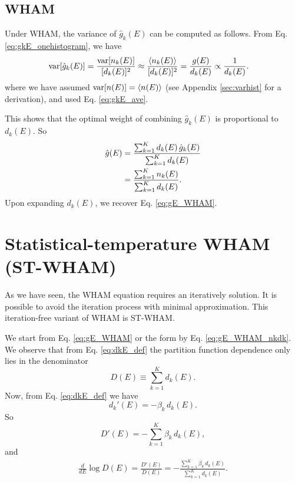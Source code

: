 \documentclass[aip,jcp,preprint,superscriptaddress]{revtex4-1}
\begin{document}
\subsection{WHAM}



Under WHAM,
the variance of $\hat g_k(E)$ can be computed as follows.
%
From Eq. \eqref{eq:gkE_onehistogram},
we have
%
\begin{align*}
\mathrm{var}[ \hat g_k(E) ]
&=
\frac{ \mathrm{var}[ n_k(E) ] }
{ [ d_k(E) ]^2 }
\approx
\frac{ \langle n_k(E) \rangle }
{ [ d_k(E) ]^2 }
=
\frac{ g(E) } { d_k(E) }
\propto
\frac{ 1 } { d_k(E) }.
\end{align*}
where we have assumed
$\mathrm{var}[ n(E) ] = \langle n(E) \rangle$
(see Appendix \ref{sec:varhist}
for a derivation),
and used Eq. \eqref{eq:gkE_ave}.



This shows that the optimal weight
of combining $\hat g_k(E)$ is proportional to $d_k(E)$.
%
So
\begin{align}
\hat g(E)
&=
\frac{ \sum_{k = 1}^K d_k(E) \, \hat g_k(E) }
     { \sum_{k = 1}^K d_k(E) }
\notag \\
&=
\frac{ \sum_{k = 1}^K n_k(E) }
     { \sum_{k = 1}^K d_k(E) }.
\label{eq:gE_WHAM_nkdk}
\end{align}
%
Upon expanding $d_k(E)$,
we recover Eq. \eqref{eq:gE_WHAM}.




\section{\label{sec:ST-WHAM}
Statistical-temperature WHAM (ST-WHAM)}



As we have seen,
the WHAM equation requires an iteratively solution.
%
It is possible to avoid the iteration process
with minimal approximation.
%
This iteration-free variant of WHAM
is ST-WHAM\cite{fenwick2008, kim2011}.



We start from Eq. \eqref{eq:gE_WHAM}
or the form by Eq. \eqref{eq:gE_WHAM_nkdk}.
%
We observe that from Eq. \eqref{eq:dkE_def}
the partition function
dependence only lies in the denominator
\[
D(E)
\equiv
\sum_{k = 1}^K d_k(E).
\]
Now, from Eq. \eqref{eq:dkE_def} we have
\[
d_k'(E)
= -\beta_k \, d_k(E).
\]
So
\[
D'(E)
= -\sum_{k = 1}^K \beta_k \, d_k(E),
\]
and
\begin{align}
\frac{d}{dE} \log D(E)
=
\frac{ D'(E) } { D(E) }
=
-\frac{ \sum_{k = 1}^K \beta_k \, d_k(E) }
      { \sum_{k = 1}^K d_k(E) }.
\label{eq:dlogD_step1}
\end{align}
\end{document}
